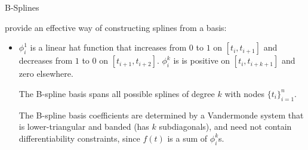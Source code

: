 \begin{frame}{B-Splines}

 provide an effective way of constructing splines from a basis:
\begin{itemize}
\sitem The basis functions can be defined recursively with respect to degree:

\item $\phi^1_i$ is a linear hat function that increases from $0$ to $1$ on $[t_i,t_{i+1}]$ and decreases from $1$ to $0$ on  $[t_{i+1},t_{i+2}]$.
\sitem $\phi^k_i$ is  is positive on $[t_i,t_{i+k+1}]$ and zero elsewhere.

\sitem The B-spline basis spans all possible splines of degree $k$ with nodes $\{t_i\}_{i=1}^n$.

\sitem The B-spline basis  coefficients are determined by a Vandermonde system that is lower-triangular and banded (has $k$ subdiagonals), and need not contain differentiability constraints, since $f(t)$ is a sum of $\phi^k_i$s.


\end{itemize}

\end{frame}










%

